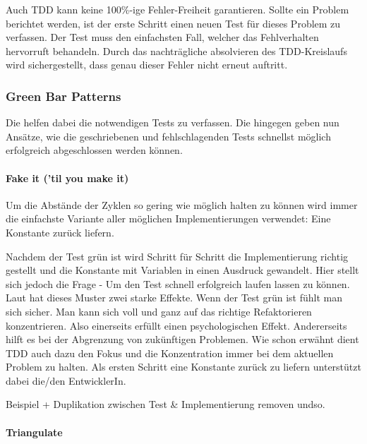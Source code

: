 Auch TDD kann keine 100\%-ige Fehler-Freiheit garantieren. Sollte ein Problem berichtet werden, ist der erste Schritt einen neuen Test für dieses Problem zu verfassen. Der Test muss den einfachsten Fall, welcher das Fehlverhalten hervorruft behandeln. Durch das nachträgliche absolvieren des TDD-Kreislaufs wird sichergestellt, dass genau dieser Fehler nicht erneut auftritt.

\subsubsection{Green Bar Patterns}

Die  helfen dabei die notwendigen Tests zu verfassen. Die  hingegen geben nun Ansätze, wie die geschriebenen und fehlschlagenden Tests schnellst möglich erfolgreich abgeschlossen werden können.

\paragraph{Fake it ('til you make it)}

Um die Abstände der  Zyklen so gering wie möglich halten zu können wird immer die einfachste Variante aller möglichen Implementierungen verwendet: Eine Konstante zurück liefern.

Nachdem der Test grün ist wird Schritt für Schritt die Implementierung richtig gestellt und die Konstante mit Variablen in einen Ausdruck gewandelt. Hier stellt sich jedoch die Frage  - Um den Test schnell erfolgreich laufen lassen zu können.
Laut \cite[152]{Beck:2003} hat dieses Muster zwei starke Effekte. Wenn der Test grün ist fühlt man sich sicher. Man kann sich voll und ganz auf das richtige Refaktorieren konzentrieren. Also einerseits erfüllt  einen psychologischen Effekt. Andererseits hilft es bei der Abgrenzung von zukünftigen Problemen. Wie schon erwähnt dient TDD auch dazu den Fokus und die Konzentration immer bei dem aktuellen Problem zu halten. Als ersten Schritt eine Konstante zurück zu liefern unterstützt dabei die/den EntwicklerIn.

Beispiel + Duplikation zwischen Test \& Implementierung removen undso.

\paragraph{Triangulate}

